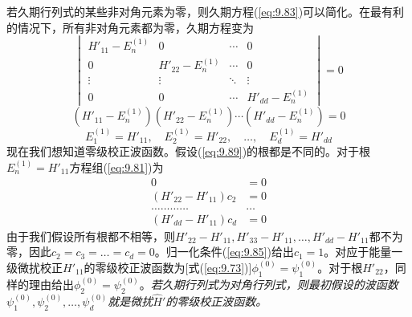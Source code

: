     若久期行列式的某些非对角元素为零，则久期方程(\ref{eq:9.83})可以简化。在最有利的情况下，所有非对角元素都为零，久期方程变为
    \begin{equation}
        \begin{vmatrix}
            H'_{11} - E_n^{\left(1\right)} & 0 & \cdots & 0 \\
            0 & H'_{22} - E_n^{\left(1\right)} & \cdots & 0 \\
            \vdots & \vdots & \ddots & \vdots \\
            0 & 0 & \cdots & H'_{dd} - E_n^{\left(1\right)}
        \end{vmatrix} = 0
        \label{eq:9.88}
    \end{equation}
    \begin{equation*}
        \left(H'_{11} - E_n^{\left(1\right)}\right)\left(H'_{22} - E_n^{\left(1\right)}\right)\cdots\left(H'_{dd} - E_n^{\left(1\right)}\right) = 0
    \end{equation*}
    \begin{equation}
        E_1^{\left(1\right)} = H'_{11}, \quad E_2^{\left(1\right)} = H'_{22}, \quad \ldots, \quad E_d^{\left(1\right)} = H'_{dd}
        \label{eq:9.89}
    \end{equation}
    现在我们想知道零级校正波函数。假设(\ref{eq:9.89})的根都是不同的。对于根$E_n^{\left(1\right)} = H'_{11}$方程组(\ref{eq:9.81})为
    \begin{equation*}
        \begin{aligned}
            0 &= 0 \\
            \left(H'_{22} - H'_{11}\right) c_2 &= 0 \\
            \ldots\ldots\ldots\ldots & \ldots \\
            \left(H'_{dd} - H'_{11}\right) c_d &= 0
        \end{aligned}
    \end{equation*}
    由于我们假设所有根都不相等，则$H'_{22} - H'_{11}, H'_{33} - H'_{11}, \ldots, H'_{dd} - H'_{11}$都不为零，因此$c_2 = c_3 = \ldots = c_d = 0$。归一化条件(\ref{eq:9.85})给出$c_1 = 1$。对应于能量一级微扰校正$H'_{11}$的零级校正波函数为[式(\ref{eq:9.73})]$\phi_1^{\left(0\right)} = \psi_1^{\left(0\right)}$。对于根$H'_{22}$，同样的理由给出$\phi_2^{\left(0\right)} = \psi_2^{\left(0\right)}$。\textit{若久期行列式为对角行列式，则最初假设的波函数$\psi_1^{\left(0\right)}, \psi_2^{\left(0\right)}, \ldots, \psi_d^{\left(0\right)}$就是微扰$\hat{H}'$的零级校正波函数。}

